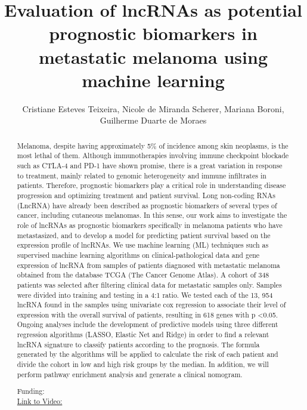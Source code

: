 \documentclass[twoside]{article}
\title{\vspace{-15mm}\fontsize{24pt}{10pt}\selectfont\textbf{ Evaluation of lncRNAs as potential prognostic biomarkers in metastatic melanoma using machine learning }} %
\author{ Cristiane Esteves Teixeira,  Nicole de Miranda Scherer,  Mariana Boroni,  Guilherme Duarte de Moraes }
\affil{ Instituto Nacional de C\^ancer,  INCA - Instituto Nacional de C\^ancer,  Brazilian National Cancer Institute (INCA) }
\date{}
\begin{document}
  
  
  \maketitle %
  
  
  \thispagestyle{fancy} %
  
  
  \begin{abstract}
  Melanoma,  despite having approximately 5\% of incidence among skin neoplasms,  is the most lethal of them. Although immunotherapies involving immune checkpoint blockade such as CTLA-4 and PD-1 have shown promise,  there is a great variation in response to treatment,  mainly related to genomic heterogeneity and immune infiltrates in patients. Therefore,  prognostic biomarkers play a critical role in understanding disease progression and optimizing treatment and patient survival. Long non-coding RNAs (LncRNA) have already been described as prognostic biomarkers of several types of cancer,  including cutaneous melanomas. In this sense,  our work aims to investigate the role of lncRNAs as prognostic biomarkers specifically in melanoma patients who have metastasized,  and to develop a model for predicting patient survival based on the expression profile of lncRNAs. We use machine learning (ML) techniques such as supervised machine learning algorithms on clinical-pathological data and gene expression of lncRNA from samples of patients diagnosed with metastatic melanoma obtained from the database TCGA (The Cancer Genome Atlas). A cohort of 348 patients was selected after filtering clinical data for metastatic samples only. Samples were divided into training and testing in a 4:1 ratio. We tested each of the 13, 954 lncRNA found in the samples  using univariate cox regression to associate their level of expression with the overall survival of patients,  resulting in 618 genes with p <0.05.   Ongoing analyses include the development of predictive models using three different regression algorithms (LASSO,  Elastic Net and Ridge) in order to find a relevant lncRNA signature to classify patients according to the prognosis. The formula generated by the algorithms will be applied to calculate the risk of each patient and divide the cohort in low and high risk groups by the median. In addition,  we will perform pathway enrichment analysis and generate a clinical nomogram.
  
  Funding:   \\
  \href{http://ab3c.org.br/xpress_pres2020/xmxp2020-300776.html}{Link to Video:}

  \end{abstract}
   
  
\end{document}
